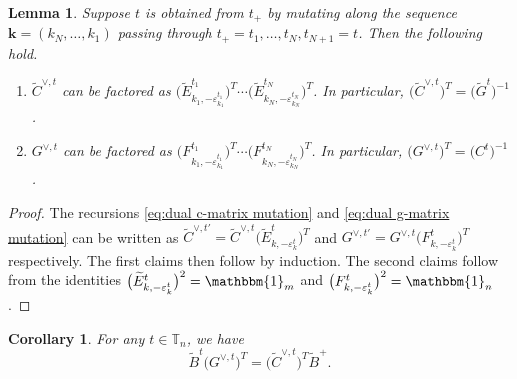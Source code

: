 \documentclass{amsart}
\newtheorem{corollary}[theorem]{Corollary}
\newtheorem{lemma}[theorem]{Lemma}
\numberwithin{theorem}{section}
\newcommand{\bfk}{{\boldsymbol{k}}}
\newcommand{\TT}{\mathbb{T}}
\newcommand{\bOne}{\mathbbm{1}}
\begin{document}
  \begin{lemma}
    Suppose $t$ is obtained from $t_+$ by mutating along the sequence $\bfk=(k_N,\ldots,k_1)$ passing through $t_+=t_1,\ldots,t_N,t_{N+1}=t$.
    Then the following hold.
    \begin{enumerate}
      \item $\widetilde C^{\vee,t}$ can be factored as $\big(\widetilde E^{t_1}_{k_1,-\varepsilon^{t_1}_{k_1}}\big)^T \cdots \big(\widetilde E^{t_N}_{k_N,-\varepsilon^{t_N}_{k_N}}\big)^T$.
        In particular, $\big(\widetilde C^{\vee,t}\big)^T=\big(\widetilde G^t\big)^{-1}$.
      \item $G^{\vee,t}$ can be factored as $\big(F^{t_1}_{k_1,-\varepsilon^{t_1}_{k_1}}\big)^T \cdots \big(F^{t_N}_{k_N,-\varepsilon^{t_N}_{k_N}}\big)^T$.
        In particular, $\big(G^{\vee,t}\big)^T=\big(C^t\big)^{-1}$.
    \end{enumerate}
  \end{lemma}
  \begin{proof}
    The recursions \eqref{eq:dual c-matrix mutation} and \eqref{eq:dual g-matrix mutation} can be written as $\widetilde C^{\vee,t'}=\widetilde C^{\vee,t} \big(\widetilde E^t_{k,-\varepsilon^t_k}\big)^T$ and $G^{\vee,t'}=G^{\vee,t} \big(F^t_{k,-\varepsilon^t_k}\big)^T$ respectively.
    The first claims then follow by induction.
    The second claims follow from the identities $\big(\widetilde E^t_{k,-\varepsilon^t_k}\big)^2=\bOne_m$ and $\big(F^t_{k,-\varepsilon^t_k}\big)^2=\bOne_n$.
  \end{proof}

  \begin{corollary}
    \label{cor:dual BG=CB}
    For any $t\in\TT_n$, we have
    \[\widetilde B^t \big(G^{\vee,t}\big)^T=\big(\widetilde C^{\vee,t}\big)^T \widetilde B^+.\]
  \end{corollary}
\end{document}

